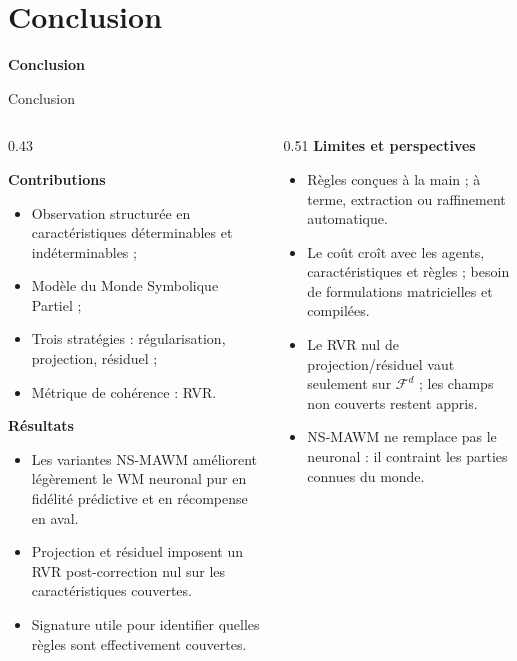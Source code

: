 \documentclass[aspectratio=169]{beamer}
\newcommand{\SectionTransitionFrame}[1]{%
  \begin{frame}[plain]
    \centering
    \vfill
    {\Huge\bfseries #1\par}
    \vfill
  \end{frame}
}
\begin{document}
\section{Conclusion}

\SectionTransitionFrame{Conclusion}

\begin{frame}{Conclusion}
  \begin{columns}[T,totalwidth=\textwidth]
    \begin{column}{0.43\textwidth}
      \scriptsize

      \textbf{Contributions}
      \begin{itemize}
        \setlength{\itemsep}{0.10em}
        \item Observation structurée en caractéristiques déterminables et indéterminables ;
        \item Modèle du Monde Symbolique Partiel ;
        \item Trois stratégies : régularisation, projection, résiduel ;
        \item Métrique de cohérence : RVR.
      \end{itemize}

      \vspace{0.10cm}
      \textbf{Résultats}
      \begin{itemize}
        \setlength{\itemsep}{0.10em}
        \item Les variantes NS-MAWM améliorent légèrement le WM neuronal pur
              en fidélité prédictive et en récompense en aval.
        \item Projection et résiduel imposent un RVR post-correction nul sur
              les caractéristiques couvertes.
        \item Signature utile pour identifier
              quelles règles sont effectivement couvertes.
      \end{itemize}
    \end{column}
    \begin{column}{0.51\textwidth}
      \vspace{1.5cm}
      \scriptsize
      \textbf{Limites et perspectives}
      \begin{itemize}
        \setlength{\itemsep}{0.10em}
        \item Règles conçues à la main ;
              à terme, extraction ou raffinement automatique.
        \item Le coût croît avec les agents, caractéristiques et règles ;
              besoin de formulations matricielles et compilées.
        \item Le RVR nul de projection/résiduel vaut seulement sur
              $\mathcal{F}^d$ ; les champs non couverts restent appris.
        \item NS-MAWM ne remplace pas le neuronal :
              il contraint les parties connues du monde.
      \end{itemize}
    \end{column}
  \end{columns}
\end{frame}
\end{document}
